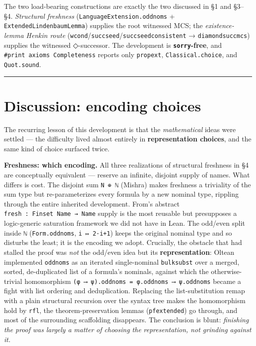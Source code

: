 \documentclass[11pt,a4paper]{article}
\renewcommand{\_}{\origtextunderscore\allowbreak}
\begin{document}
The two load-bearing constructions are exactly the two discussed in §1 and §3--§4. \emph{Structural freshness} (\texttt{LanguageExtension.odd\_noms} + \texttt{ExtendedLindenbaumLemma}) supplies the root witnessed MCS; the \emph{existence-lemma Henkin route} (\texttt{wcond}/\texttt{succ\_seed}/\texttt{succ\_seed\_consistent} → \texttt{diamond\_succ\_mcs}) supplies the witnessed ◇-successor. The development is \textbf{\texttt{sorry}-free}, and \texttt{\#print\ axioms\ Completeness} reports only \texttt{propext}, \texttt{Classical.choice}, and \texttt{Quot.sound}.

\begin{center}\rule{0.5\linewidth}{0.5pt}\end{center}

\hypertarget{discussion-encoding-choices}{%
\section{Discussion: encoding choices}\label{discussion-encoding-choices}}

The recurring lesson of this development is that the \emph{mathematical} ideas were settled --- the difficulty lived almost entirely in \textbf{representation choices}, and the same kind of choice surfaced twice.

\textbf{Freshness: which encoding.} All three realizations of structural freshness in §4 are conceptually equivalent --- reserve an infinite, disjoint supply of names. What differs is cost. The disjoint sum \texttt{N\ ⊕\ ℕ} (Mishra) makes freshness a triviality of the sum type but re-parameterizes every formula by a new nominal type, rippling through the entire inherited development. From's abstract \texttt{fresh\ :\ Finset\ Name\ →\ Name} supply is the most reusable but presupposes a logic-generic saturation framework we did not have in Lean. The odd/even split inside \texttt{ℕ} (\texttt{Form.odd\_noms}, \texttt{i\ ↦\ 2·i+1}) keeps the original nominal type and so disturbs the least; it is the encoding we adopt. Crucially, the obstacle that had stalled the proof was \emph{not} the odd/even idea but its \textbf{representation}: Oltean implemented \texttt{odd\_noms} as an iterated single-nominal \texttt{bulk\_subst} over a merged, sorted, de-duplicated list of a formula's nominals, against which the otherwise-trivial homomorphism \texttt{(φ\ ⟶\ ψ).odd\_noms\ =\ φ.odd\_noms\ ⟶\ ψ.odd\_noms} became a fight with list ordering and deduplication. Replacing the list-substitution remap with a plain structural recursion over the syntax tree makes the homomorphism hold by \texttt{rfl}, the theorem-preservation lemmas (\texttt{pf\_extended}) go through, and most of the surrounding scaffolding disappears. The conclusion is blunt: \emph{finishing the proof was largely a matter of choosing the representation, not grinding against it.}
\end{document}
